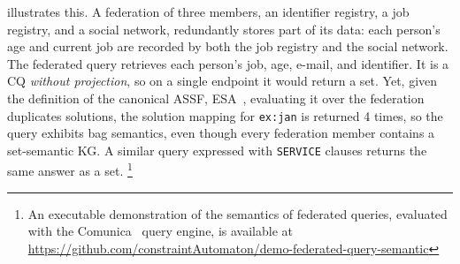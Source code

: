  illustrates this.
A federation of three members, an identifier registry, a job registry, and a social network, redundantly stores part of its data: each person's age and current job are recorded by both the job registry and the social network.
The federated query retrieves each person's job, age, e-mail, and identifier.
It is a \ac{CQ} \emph{without projection}, so on a single endpoint it would return a set.
Yet, given the definition of the canonical \ac{ASSF}, \ac{ESA}~\cite{Cheng2021}, evaluating it over the federation duplicates solutions, the solution mapping for \texttt{ex:jan} is returned 4 times, so the query exhibits bag semantics, even though every federation member contains a set-semantic \ac{KG}.
A similar query expressed with \texttt{SERVICE} clauses returns the same answer as a set.
\footnote{An executable demonstration of the semantics of federated queries, evaluated with the Comunica~\cite{taelman_iswc_resources_comunica_2018} query engine, is available at \url{https://github.com/constraintAutomaton/demo-federated-query-semantic}}
